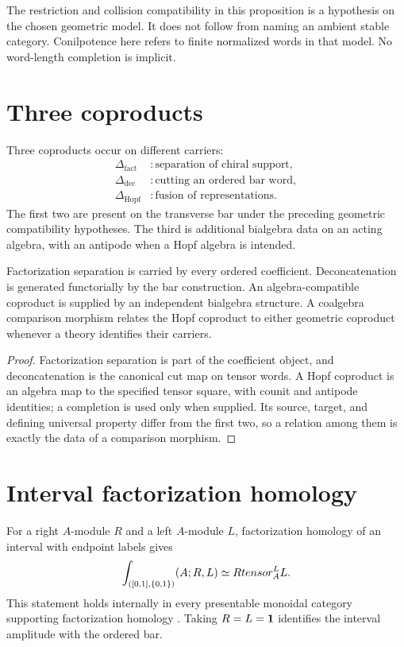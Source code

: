 The restriction and collision compatibility in this proposition is a hypothesis on the
chosen geometric model. It does not follow from naming an ambient stable category.
Conilpotence here refers to finite normalized words in that model.
No word-length completion is implicit.


\section{Three coproducts}
Three coproducts occur on different carriers:
\[
\begin{aligned}
 \Delta_{\mathrm{fact}}&:\text{separation of chiral support},\\
 \Delta_{\mathrm{dec}}&:\text{cutting an ordered bar word},\\
 \Delta_{\mathrm{Hopf}}&:\text{fusion of representations}.
\end{aligned}
\]
The first two are present on the transverse bar under the preceding geometric compatibility hypotheses. The third is additional bialgebra data on an acting algebra, with an antipode when a Hopf algebra is intended.

\begin{proposition}
Factorization separation is carried by every ordered coefficient.  Deconcatenation is generated functorially by the bar construction.  An algebra-compatible coproduct is supplied by an independent bialgebra structure.  A coalgebra comparison morphism relates the Hopf coproduct to either geometric coproduct whenever a theory identifies their carriers.
\end{proposition}
\begin{proof}
Factorization separation is part of the coefficient object, and deconcatenation is the canonical cut map on tensor words.  A Hopf coproduct is an algebra map to the specified tensor square, with counit and antipode identities; a completion is used only when supplied.  Its source, target, and defining universal property differ from the first two, so a relation among them is exactly the data of a comparison morphism.
\end{proof}

\section{Interval factorization homology}
For a right $A$-module $R$ and a left $A$-module $L$, factorization homology of an interval with endpoint labels gives
\[
 \int_{([0,1],\{0,1\})}(A;R,L)
 \simeq R\tensor_A^{\mathbb L}L.
\]
This statement holds internally in every presentable monoidal category supporting factorization homology \cite{AFT,LurieHA}. Taking $R=L=\mathbbm1$ identifies the interval amplitude with the ordered bar.


